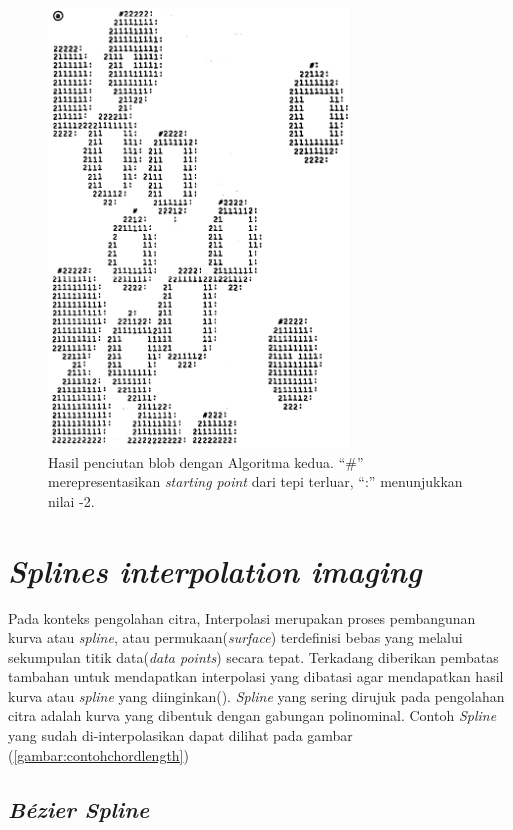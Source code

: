 \begin{figure}[H]
	\centering
	\includegraphics[keepaspectratio, width=8cm]{gambar/BorderFollowingPustaka/pic5.png}
	\caption{Hasil penciutan blob dengan 
	Algoritma kedua. “\#” merepresentasikan 
	\textit{starting point} dari tepi terluar, 
	“:” menunjukkan nilai -2.}
	\label{gambar:hasil_penciutan_blob}
\end{figure}

\section{\emph{Splines interpolation imaging}}

Pada konteks pengolahan citra, Interpolasi merupakan proses 
pembangunan kurva atau \textit{spline}, atau permukaan(\textit{surface}) terdefinisi 
bebas yang melalui sekumpulan titik data(\textit{data points}) 
secara tepat. Terkadang diberikan pembatas tambahan untuk 
mendapatkan interpolasi yang dibatasi agar mendapatkan hasil 
kurva atau \textit{spline} yang diinginkan(\cite{lockyer2006controlling}). \textit{Spline} 
yang sering dirujuk pada pengolahan citra adalah kurva yang 
dibentuk dengan gabungan polinominal. Contoh \textit{Spline} 
yang sudah di-interpolasikan dapat dilihat pada gambar (\ref{gambar:contohchordlength})


\subsection{\emph{Bézier Spline}}

